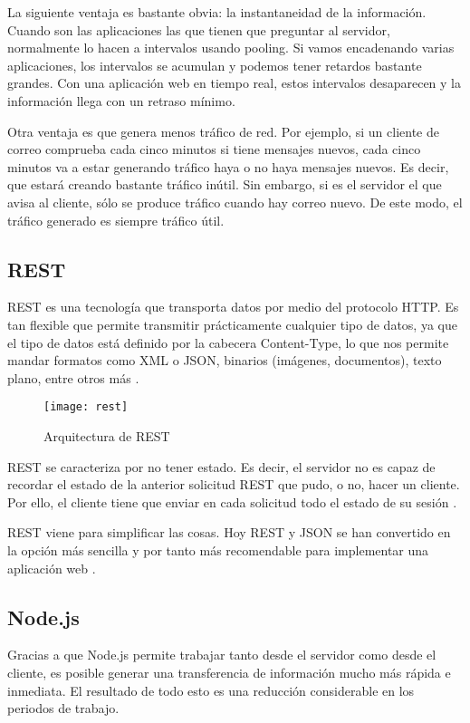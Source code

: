 La siguiente ventaja es bastante obvia: la instantaneidad de la información. Cuando son las aplicaciones las que tienen que preguntar al servidor, normalmente lo hacen a intervalos usando pooling. Si vamos encadenando varias aplicaciones, los intervalos se acumulan y podemos tener retardos bastante grandes. Con una aplicación web en tiempo real, estos intervalos desaparecen y la información llega con un retraso mínimo.

Otra ventaja es que genera menos tráfico de red. Por ejemplo, si un cliente de correo comprueba cada cinco minutos si tiene mensajes nuevos, cada cinco minutos va a estar generando tráfico haya o no haya mensajes nuevos. Es decir, que estará creando bastante tráfico inútil. Sin embargo, si es el servidor el que avisa al cliente, sólo se produce tráfico cuando hay correo nuevo. De este modo, el tráfico generado es siempre tráfico útil.

\subsection{REST}

REST es una tecnología que transporta datos por medio del protocolo HTTP. Es tan flexible que permite transmitir prácticamente cualquier tipo de datos, ya que el tipo de datos está definido por la cabecera Content-Type, lo que nos permite mandar formatos como XML o JSON, binarios (imágenes, documentos), texto plano, entre otros más \cite{rest1}.

\begin{figure}[htp!]
  \centering
  \texttt{[image: rest]}
  \caption{Arquitectura de REST}
  \label{fig:rest}
\end{figure}

REST se caracteriza por no tener estado. Es decir, el servidor no es capaz de recordar el estado de la anterior solicitud REST que pudo, o no, hacer un cliente. Por ello, el cliente tiene que enviar en cada solicitud todo el estado de su sesión \cite{web2}.

REST viene para simplificar las cosas. Hoy REST y JSON se han convertido en la opción más sencilla y por tanto más recomendable para implementar una aplicación web \cite{web2}.

\subsection{Node.js}

Gracias a que Node.js permite trabajar tanto desde el servidor como desde el cliente, es posible generar una transferencia de información mucho más rápida e inmediata. El resultado de todo esto es una reducción considerable en los periodos de trabajo.

